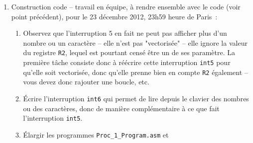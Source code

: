 \documentclass{article}
\begin{document}
\begin{enumerate}
\begin{enumerate}
  ma\^\i tre~? 
  Pourquoi suffit-il pour le noyau de faire \texttt{LDPSW} d'un processus P
  pour "se brancher sur le code de P"~?
\item D\'etaillez pas \`a pas ce que fait \texttt{int2} (comme est d\'ecrit le
  d\'eroulement de chacune des trois autres dans ce document). 
\item D\'etaillez la structure de la tranche de m\'emoire de chaque processus
  (regardez la m\'ethode \texttt{CPU$::$interrupt()} et l'instruction
  \texttt{LDPSW}, ainsi que le code noyau de \texttt{int3},
  et enfin les instructions manipulant \texttt{spReg} ainsi que
  \texttt{Memory$::$setUp()}) 
\item \`A quoi sert la ligne 168 de \texttt{Proc\_0\_Program.asm}~?
\item D\'etaillez la structure de la tranche de m\'emoire du noyau (regardez
  son code dans \texttt{Proc\_0\_Program.asm} et la ligne 
\begin{verbatim}
mem[KERNELPID] . storeAt(KERNELSAVECURRENTPROCID, prReg . getVal());
\end{verbatim}
de \texttt{CPU$::$interrupt()}).
\item Quelles sont les limitations (nombre de processus, nombre de
  s\'emaphores, de semop()s, etc.) pr\'esentes dans ce projet, telles qu'elles
  sont impos\'ees par la structure de la m\'emoire et par les valeurs de ces
  constantes d\'efinies dans le code.
\end{enumerate}
\item Construction code  -- travail en \'equipe, \`a
  rendre ensemble avec le code (voir point pr\'ec\'edent), pour le 23 d\'ecembre
  2012, 23h59 heure de Paris~:
\begin{enumerate}
\item Observez que l'interruption 5 en fait ne peut pas afficher plus d'un
  nombre ou un caract\`ere -- elle n'est pas "vectoris\'ee" -- elle ignore la
  valeur du registre \texttt{R2}, lequel est pourtant cens\'e \^etre un de ses
  param\`etre. La premi\`ere
  t\^ache consiste donc \`a r\'e\'ecrire cette interruption \texttt{int5} pour
  qu'elle soit vectoris\'ee, donc qu'elle prenne bien en compte \texttt{R2}
  \'egalement -- vous devez donc rajouter une boucle, etc.
\item \'Ecrire l'interruption \texttt{int6} qui permet de lire depuis le
  clavier des nombres ou des caract\`eres, donc de mani\`ere compl\'ementaire
  \`a ce que fait l'interruption \texttt{int5}.
\item \'Elargir les programmes \texttt{Proc\_1\_Program.asm} et

\end{enumerate}
\end{enumerate}
\end{document}

